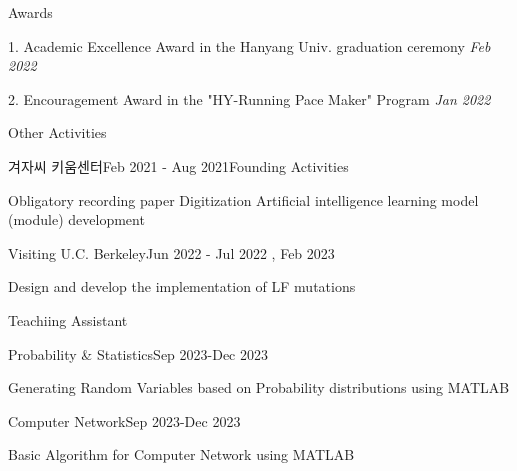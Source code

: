 \documentclass[
	11pt, %
]{resume} %
\begin{document}
\begin{rSection}{Awards}

	1. Academic Excellence Award in the Hanyang Univ. graduation ceremony \hfill \textit {Feb 2022}

	2. Encouragement Award in the "HY-Running Pace Maker" Program \hfill \textit {Jan 2022}

\end{rSection}

\begin{rSection}{Other Activities}

	\begin{rSubsection}{겨자씨 키움센터}{Feb 2021 - Aug 2021}{Founding Activities}{}
		\item Obligatory recording paper Digitization Artiﬁcial intelligence learning model (module) development
	\end{rSubsection}

	\begin{rSubsection}{Visiting U.C. Berkeley}{Jun 2022 - Jul 2022 , Feb 2023}{}{}
		\item Design and develop the implementation of LF mutations
	\end{rSubsection}

\end{rSection}

\begin{rSection}{Teachiing Assistant}

	\begin{rSubsection}{Probability \& Statistics}{Sep 2023-Dec 2023}{}{}
		\item Generating Random Variables based on Probability distributions using MATLAB
	\end{rSubsection}

	\begin{rSubsection}{Computer Network}{Sep 2023-Dec 2023}{}{}
		\item Basic Algorithm for Computer Network using MATLAB
	\end{rSubsection}

\end{rSection}

\end{document}

